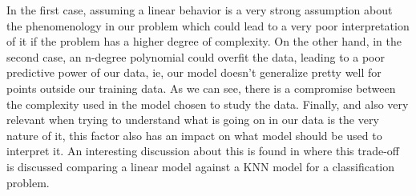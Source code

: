In the first case, assuming a linear behavior is a very strong assumption about the phenomenology in our problem which could lead to a very poor interpretation of it if the problem has a higher degree of complexity. On the other hand, in the second case, an n-degree polynomial could overfit the data, leading to a poor predictive power of our data, ie, our model doesn't generalize pretty well for points outside our training data. As we can see, there is a compromise between the complexity used in the model chosen to study the data. Finally, and also very relevant when trying to understand what is going on in our data is the very nature of it, this factor also has an impact on what model should be used to interpret it. An interesting discussion about this is found in  \cite{Hastie2003} where this trade-off is discussed comparing a linear model against a KNN model for a classification problem.